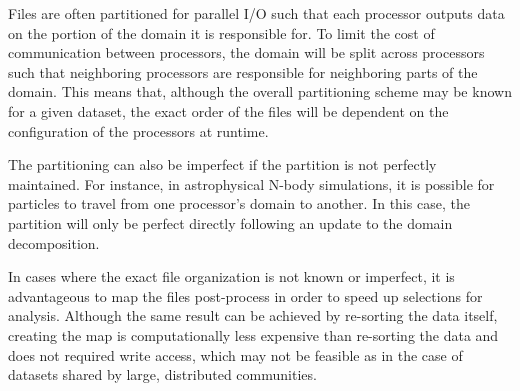 \documentclass[apjl]{emulateapj}
\begin{document}
Files are often partitioned for parallel I/O such that each processor outputs data on the portion of the domain it is responsible for. To limit the cost of communication between processors, the domain will be split across processors such that neighboring processors are responsible for neighboring parts of the domain. This means that, although the overall partitioning scheme may be known for a given dataset, the exact order of the files will be dependent on the configuration of the processors at runtime. 

The partitioning can also be imperfect if the partition is not perfectly maintained. For instance, in astrophysical N-body simulations, it is possible for particles to travel from one processor's domain to another. In this case, the partition will only be perfect directly following an update to the domain decomposition. 

In cases where the exact file organization is not known or imperfect, it is advantageous to map the files post-process in order to speed up selections for analysis. Although the same result can be achieved by re-sorting the data itself, creating the map is computationally less expensive than re-sorting the data and does not required write access, which may not be feasible as in the case of datasets shared by large, distributed communities.

\end{document}
